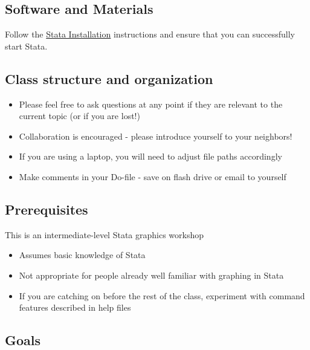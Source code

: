 \documentclass[
]{book}
\providecommand{\tightlist}{%
  \setlength{\itemsep}{0pt}\setlength{\parskip}{0pt}}
\begin{document}
\hypertarget{software-and-materials-9}{%
\subsection{Software and Materials}\label{software-and-materials-9}}

Follow the \href{./StataInstall.html}{Stata Installation} instructions and ensure that you can successfully start Stata.

\hypertarget{class-structure-and-organization-3}{%
\subsection{Class structure and organization}\label{class-structure-and-organization-3}}

\begin{itemize}
\tightlist
\item
  Please feel free to ask questions at any point if they are relevant to the current topic (or if you are lost!)
\item
  Collaboration is encouraged - please introduce yourself to your neighbors!
\item
  If you are using a laptop, you will need to adjust file paths accordingly
\item
  Make comments in your Do-file - save on flash drive or email to yourself
\end{itemize}

\hypertarget{prerequisites-9}{%
\subsection{Prerequisites}\label{prerequisites-9}}

This is an intermediate-level Stata graphics workshop

\begin{itemize}
\tightlist
\item
  Assumes basic knowledge of Stata
\item
  Not appropriate for people already well familiar with graphing in Stata
\item
  If you are catching on before the rest of the class, experiment with command features described in help files
\end{itemize}

\hypertarget{goals-8}{%
\subsection{Goals}\label{goals-8}}
\end{document}
